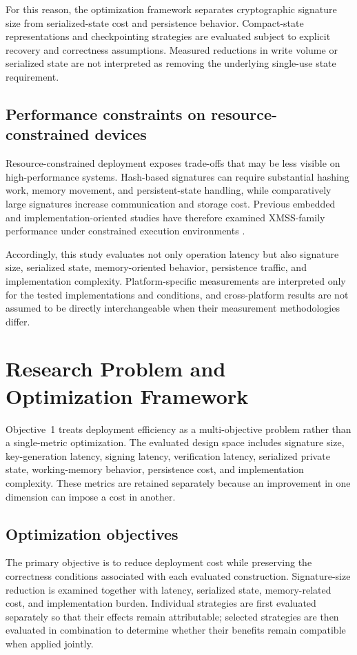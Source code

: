 \documentclass[pdflatex,sn-mathphys-num]{sn-jnl}
\begin{document}
For this reason, the optimization framework separates cryptographic
signature size from serialized-state cost and persistence behavior.
Compact-state representations and checkpointing strategies are
evaluated subject to explicit recovery and correctness assumptions.
Measured reductions in write volume or serialized state are not
interpreted as removing the underlying single-use state requirement.

\subsection{Performance constraints on resource-constrained devices}
Resource-constrained deployment exposes trade-offs that may be less
visible on high-performance systems. Hash-based signatures can require
substantial hashing work, memory movement, and persistent-state
handling, while comparatively large signatures increase communication
and storage cost. Previous embedded and implementation-oriented studies
have therefore examined XMSS-family performance under constrained
execution environments \cite{Campos2020LMSvsXMSS,
Wang2020XMSSEmbedded,Bos2021RapidXMSS,Thoma2024AgileHBS}.

Accordingly, this study evaluates not only operation latency but also
signature size, serialized state, memory-oriented behavior,
persistence traffic, and implementation complexity. Platform-specific
measurements are interpreted only for the tested implementations and
conditions, and cross-platform results are not assumed to be directly
interchangeable when their measurement methodologies differ.

\section{Research Problem and Optimization Framework}
\label{sec:framework}

Objective~1 treats deployment efficiency as a multi-objective
problem rather than a single-metric optimization. The evaluated design
space includes signature size, key-generation latency, signing
latency, verification latency, serialized private state, working-memory
behavior, persistence cost, and implementation complexity. These
metrics are retained separately because an improvement in one dimension
can impose a cost in another.

\subsection{Optimization objectives}
The primary objective is to reduce deployment cost while preserving
the correctness conditions associated with each evaluated
construction. Signature-size reduction is examined together with
latency, serialized state, memory-related cost, and implementation
burden. Individual strategies are first evaluated separately so that
their effects remain attributable; selected strategies are then
evaluated in combination to determine whether their benefits remain
compatible when applied jointly.
\end{document}

